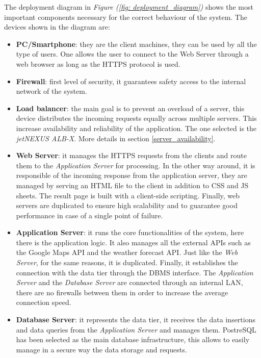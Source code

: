 \documentclass[table, 12pt]{article}
\begin{document}
The deployment diagram in \textit{Figure (\ref{fig: deployment_diagram})} shows the most important components necessary for the correct behaviour of the system.
The devices shown in the diagram are:
\begin{itemize}
    \item \textbf{PC/Smartphone}: they are the client machines, they can be used by all the type of users.
    One allows the user to connect to the Web Server through a web browser as long as the HTTPS protocol is used.
    \item \textbf{Firewall}: first level of security, it guarantees safety access to the internal network of the system.
    \item \textbf{Load balancer}: the main goal is to prevent an overload of a server, this device distributes the incoming requests equally across multiple servers.
    This increase availability and reliability of the application.
    The one selected is the \textit{jetNEXUS ALB-X}. More details in section \ref{server_availability}.
    \item \textbf{Web Server}: it manages the HTTPS requests from the clients and route them to the \textit{Application Server} for processing.
    In the other way around, it is responsible of the incoming response from the application server, they are managed by serving an HTML file to the client in addition to CSS and JS sheets.
    The result page is built with a client-side scripting.
    Finally, web servers are duplicated to ensure high scalability and to guarantee good performance in case of a single point of failure.
    \item \textbf{Application Server}: it runs the core functionalities of the system, here there is the application logic.
    It also manages all the external APIs such as the Google Maps API and the weather forecast API.
    Just like the \textit{Web Server}, for the same reasons, it is duplicated.
    Finally, it establishes the connection with the data tier through the DBMS interface. The \textit{Application Server} and the \textit{Database Server} are connected through an internal LAN, there are no firewalls between them in order to increase the average connection speed.

    \item \textbf{Database Server}: it represents the data tier, it receives the data insertions and data queries from the \textit{Application Server} and manages them.
    PostreSQL has been selected as the main database infrastructure, this allows to easily manage in a secure way the data storage and requests.
    
\end{itemize}
\newpage
\end{document}
